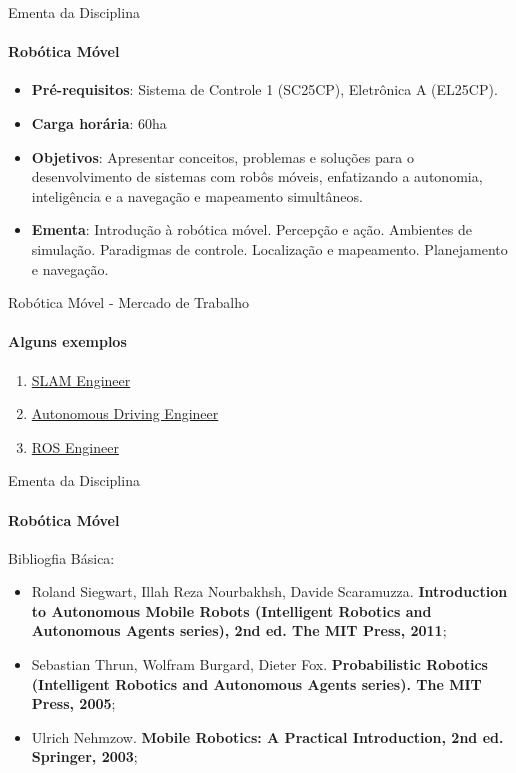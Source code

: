 \documentclass{beamer}
\begin{document}
\begin{frame}[c]{Ementa da Disciplina}
	\framesubtitle{Robótica Móvel}

	\begin{block}{}
		\begin{itemize}
			\item \textbf{Pré-requisitos}: Sistema de Controle 1 (SC25CP), Eletrônica A (EL25CP).
			\item \textbf{Carga horária}: 60ha
			\item \textbf{Objetivos}: Apresentar conceitos, problemas e soluções para o desenvolvimento de sistemas com robôs móveis, enfatizando a autonomia, inteligência e a navegação e mapeamento simultâneos.
			\item \textbf{Ementa}: Introdução à robótica móvel. Percepção e ação. Ambientes de simulação.
			      Paradigmas de controle. Localização e mapeamento. Planejamento e navegação.
		\end{itemize}
	\end{block}
\end{frame}


\begin{frame}[t]{Robótica Móvel - Mercado de Trabalho}
	\framesubtitle{Alguns exemplos}

	\begin{enumerate}
		\item \href{https://www.indeed.com/q-Slam-Engineer-jobs.html}{SLAM Engineer}
		\item \href{https://www.indeed.com/q-Autonomous-Driving-Engineer-jobs.html}{Autonomous Driving Engineer}
		\item \href{http://wiki.ros.org/Jobs}{ROS Engineer}
	\end{enumerate}
\end{frame}


\begin{frame}[c]{Ementa da Disciplina}
	\framesubtitle{Robótica Móvel}

	\begin{block}{Bibliogfia Básica:}
	\end{block}
	\begin{itemize}
		\justifying
		\item Roland Siegwart, Illah Reza Nourbakhsh, Davide Scaramuzza. \textbf{Introduction to Autonomous Mobile Robots (Intelligent Robotics and Autonomous Agents series), 2nd ed. The MIT Press, 2011};
		\item Sebastian Thrun, Wolfram Burgard, Dieter Fox. \textbf{Probabilistic Robotics (Intelligent Robotics and Autonomous Agents series). The MIT Press, 2005};
		\item Ulrich Nehmzow. \textbf{Mobile Robotics: A Practical Introduction, 2nd ed. Springer, 2003};
	\end{itemize}
\end{frame}
\end{document}

